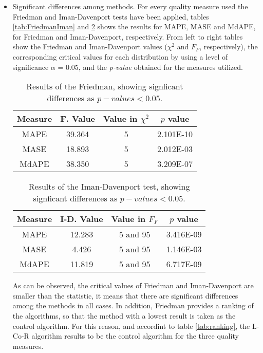 \documentclass[a4paper,twoside]{article}
\newcommand{\metodo}{L-Co-R}
\begin{document}
\begin{itemize}
  \item Significant differences among methods. For every quality measure used the Friedman and Iman-Davenport tests have been applied, tables \ref{tab:FriedmanIman} and \ref{tab:ImanDavenport} 
  shows the results for MAPE, MASE and MdAPE, for Friedman and Iman-Davenport, respectively. From left to right tables show the Friedman and Iman-Davenport values ($\chi^2$ and $F_F$, respectively), the corresponding critical values for each distribution by using a level of significance $\alpha$ = 0.05, and the \emph{p-value} obtained for the measures utilized.

    \begin{table}[h]
        \caption{Results of the Friedman, showing signficant differences as $p-values<0.05$.}
        \label{tab:Friedman}
        \centering
        \begin{tabular}{|c|c|c|c|}
         \hline Measure & F. Value & Value in $\chi^2$ & $p$ value \\
         \hline MAPE	&	39.364	&	5	&	2.101E-10	\\
         \hline MASE	&	18.893	&	5	&	2.012E-03	\\
         \hline MdAPE	&	38.350	&	5	&	3.209E-07	\\
         \hline
        \end{tabular}
    \end{table}

    \begin{table}[h]
        \caption{Results of the Iman-Davenport test, showing signficant differences as $p-values<0.05$. }
        \label{tab:ImanDavenport}
        \centering
        \begin{tabular}{|c|c|c|c|}
         \hline Measure &  I-D. Value & Value in $F_F$ & $p$ value \\
         \hline MAPE	&	12.283	&	5 and 95	&	3.416E-09\\
         \hline MASE	&	4.426	&	5 and 95	&	1.146E-03\\
         \hline MdAPE	&	11.819	&	5 and 95	&	6.717E-09\\
         \hline
        \end{tabular}
    \end{table}
      

    As can be observed, the critical values of Friedman and Iman-Davenport are smaller than the statistic, it means that there are significant differences among the methods in all cases.
    In addition, Friedman provides a ranking of the algorithms, so that the method with a lowest result is taken as the control algorithm. For this reason, and accordint to table \ref{tab:ranking}, the {\metodo} algorithm results to be the control algorithm for the three quality measures.


\end{itemize}
\end{document}

